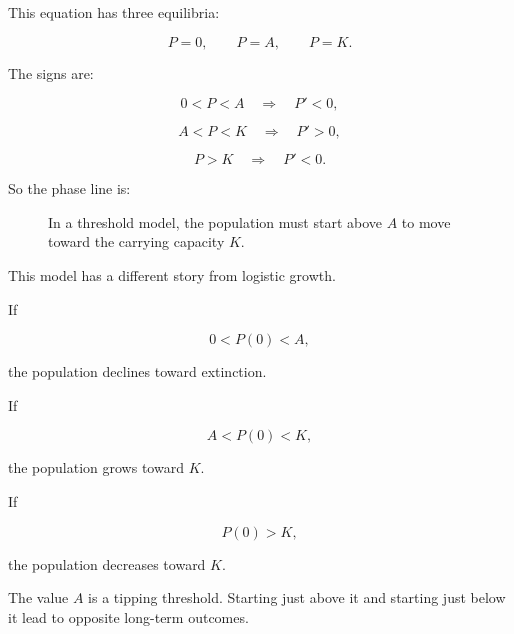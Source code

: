 This equation has three equilibria:

\[
P=0,\qquad P=A,\qquad P=K.
\]

The signs are:

\[
0<P<A
\quad\Longrightarrow\quad
P'<0,
\]

\[
A<P<K
\quad\Longrightarrow\quad
P'>0,
\]

\[
P>K
\quad\Longrightarrow\quad
P'<0.
\]

So the phase line is:

\begin{figure}[h]
\centering
{}
\caption{In a threshold model, the population must start above \(A\) to move toward the carrying capacity \(K\).}
\label{fig:threshold-phase-line}
\end{figure}

This model has a different story from logistic growth.

If

\[
0<P(0)<A,
\]

the population declines toward extinction.

If

\[
A<P(0)<K,
\]

the population grows toward \(K\).

If

\[
P(0)>K,
\]

the population decreases toward \(K\).

The value \(A\) is a tipping threshold.  Starting just above it and starting just below it
lead to opposite long-term outcomes.

